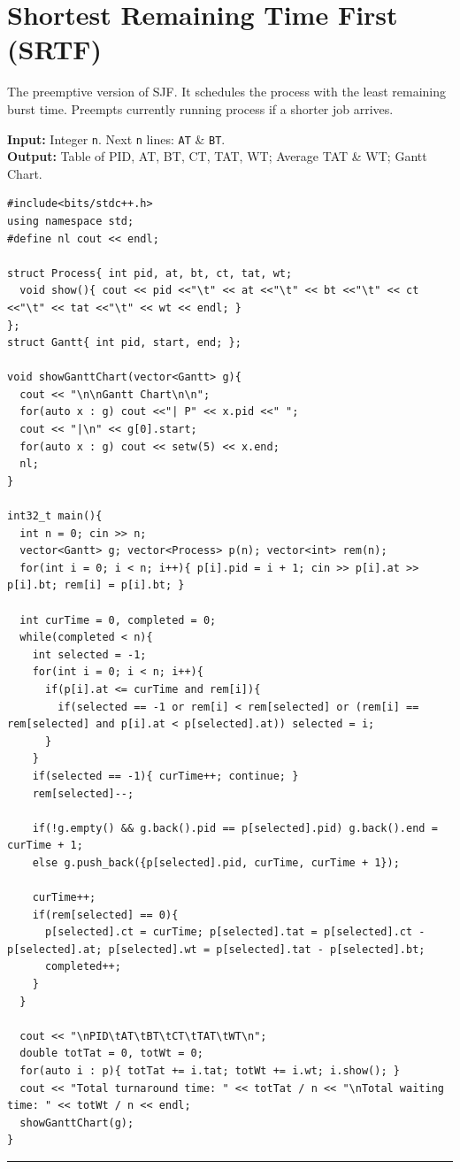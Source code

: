\documentclass[10pt, a4paper]{article}
\begin{document}
\section{Shortest Remaining Time First (SRTF)}
The preemptive version of SJF. It schedules the process with the least remaining burst time. Preempts currently running process if a shorter job arrives.

\begin{tcolorbox}[title=Input \& Output Format, iobox]
\textbf{Input:} Integer \texttt{n}. Next \texttt{n} lines: \texttt{AT} \& \texttt{BT}.\\
\textbf{Output:} Table of PID, AT, BT, CT, TAT, WT; Average TAT \& WT; Gantt Chart.
\end{tcolorbox}

\begin{lstlisting}
#include<bits/stdc++.h>
using namespace std;
#define nl cout << endl;

struct Process{ int pid, at, bt, ct, tat, wt;
  void show(){ cout << pid <<"\t" << at <<"\t" << bt <<"\t" << ct <<"\t" << tat <<"\t" << wt << endl; }
};
struct Gantt{ int pid, start, end; };

void showGanttChart(vector<Gantt> g){
  cout << "\n\nGantt Chart\n\n";
  for(auto x : g) cout <<"| P" << x.pid <<" ";
  cout << "|\n" << g[0].start;
  for(auto x : g) cout << setw(5) << x.end;
  nl;
}

int32_t main(){
  int n = 0; cin >> n;
  vector<Gantt> g; vector<Process> p(n); vector<int> rem(n);
  for(int i = 0; i < n; i++){ p[i].pid = i + 1; cin >> p[i].at >> p[i].bt; rem[i] = p[i].bt; }

  int curTime = 0, completed = 0;
  while(completed < n){
    int selected = -1;
    for(int i = 0; i < n; i++){
      if(p[i].at <= curTime and rem[i]){
        if(selected == -1 or rem[i] < rem[selected] or (rem[i] == rem[selected] and p[i].at < p[selected].at)) selected = i;
      }
    }
    if(selected == -1){ curTime++; continue; }
    rem[selected]--;
    
    if(!g.empty() && g.back().pid == p[selected].pid) g.back().end = curTime + 1;
    else g.push_back({p[selected].pid, curTime, curTime + 1});
    
    curTime++;
    if(rem[selected] == 0){
      p[selected].ct = curTime; p[selected].tat = p[selected].ct - p[selected].at; p[selected].wt = p[selected].tat - p[selected].bt;
      completed++;
    }
  }

  cout << "\nPID\tAT\tBT\tCT\tTAT\tWT\n";
  double totTat = 0, totWt = 0;
  for(auto i : p){ totTat += i.tat; totWt += i.wt; i.show(); }
  cout << "Total turnaround time: " << totTat / n << "\nTotal waiting time: " << totWt / n << endl;
  showGanttChart(g);  
}
\end{lstlisting}
\vspace{1em}
\hrule
\vspace{1em}
\end{document}
